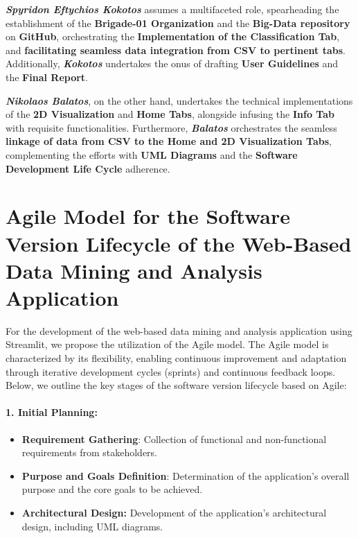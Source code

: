 \documentclass[unnumsec,webpdf,contemporary,large]{oup-authoring-template}%
\theoremstyle{thmstyleone}%
\theoremstyle{thmstyletwo}%
\theoremstyle{thmstylethree}%
\begin{document}
\textbf{\textit{Spyridon Eftychios Kokotos}} assumes a multifaceted role, spearheading the establishment of the \textbf{Brigade-01 Organization} and the \textbf{Big-Data repository} on \textbf{GitHub}, orchestrating the \textbf{Implementation of the Classification Tab}, and \textbf{facilitating seamless data integration from CSV to pertinent tabs}. Additionally, \textbf{\textit{Kokotos}} undertakes the onus of drafting \textbf{User Guidelines} and the \textbf{Final Report}. 
\vspace{0.2cm}

\textbf{\textit{Nikolaos Balatos}}, on the other hand, undertakes the technical implementations of the \textbf{2D Visualization} and \textbf{Home Tabs}, alongside infusing the \textbf{Info Tab} with requisite functionalities. Furthermore, \textbf{\textit{Balatos}} orchestrates the seamless \textbf{linkage of data from CSV to the Home and 2D Visualization Tabs}, complementing the efforts with \textbf{UML Diagrams} and the \textbf{Software Development Life Cycle} adherence.
\vspace{0.2cm}

\section{Agile Model for the Software Version Lifecycle of the Web-Based Data Mining and Analysis Application}
\vspace{0.2cm}

For the development of the web-based data mining and analysis application using Streamlit, we propose the utilization of the Agile model. The Agile model is characterized by its flexibility, enabling continuous improvement and adaptation through iterative development cycles (sprints) and continuous feedback loops. Below, we outline the key stages of the software version lifecycle based on Agile:
\vspace{0.2cm}

\paragraph{1. Initial Planning:}
\vspace{0.2cm}

\begin{itemize}
    \item \textbf{Requirement Gathering}: Collection of functional and non-functional requirements from stakeholders.
    \vspace{0.1cm}
    \item \textbf{Purpose and Goals Definition}: Determination of the application's overall purpose and the core goals to be achieved.
    \vspace{0.1cm}
    \item \textbf{Architectural Design:} Development of the application's architectural design, including UML diagrams.
\end{itemize}
\vspace{0.1cm}
\end{document}
